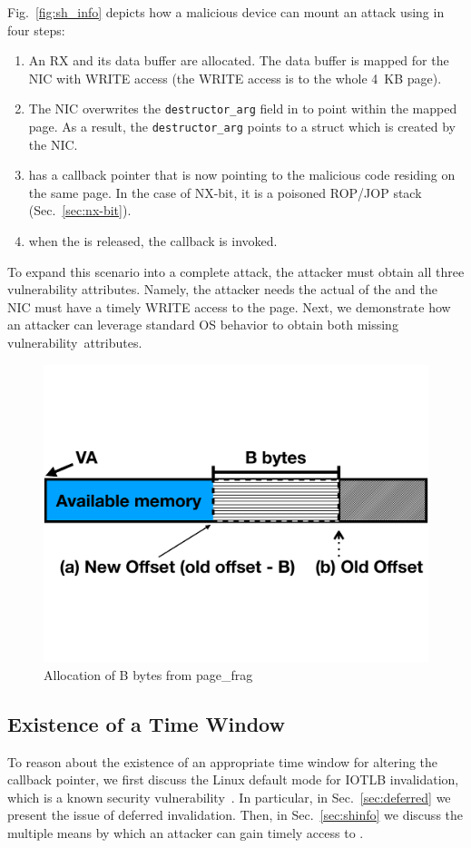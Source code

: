 Fig.~\ref{fig:sh_info} depicts how a malicious device can mount an attack using \shinfo{} in four steps:
\begin{enumerate}[label=(\alph*)]
    \item An RX \skb{} and its data buffer are allocated. The data buffer is mapped for the NIC with WRITE access (the WRITE access is to the whole 4~KB page). 
    \item The NIC overwrites the \texttt{destructor\_arg} field in \shinfo{} to point within the mapped page. As a result, the \texttt{destructor\_arg} points to a struct \uarg{} which is created by the NIC.
    \item \uarg{} has a callback pointer that is now pointing to the malicious code residing on the same page. In the case of NX-bit, it is a poisoned ROP/JOP\cite{BJFL11} stack (Sec.~\ref{sec:nx-bit}).
    \item when the \skb{} is released, the callback is invoked.
\end{enumerate}
To expand this scenario into a complete attack, the attacker must obtain all three vulnerability attributes. Namely, the attacker needs the actual \kva{} of the \mabaf{} and the NIC must have a timely WRITE access to the page. Next, we demonstrate how an attacker can leverage standard OS behavior to obtain both missing \mbox{vulnerability attributes.}

\begin{figure}[t]
    \centering
    \includegraphics[width=0.65\linewidth,trim=0 6cm 0 6cm, clip]{figs/page_frag.pdf}
    \caption{Allocation of B bytes from page\_frag}
    \label{fig:page_frags}
\end{figure}

\subsection{Existence of a Time Window}\label{sec:timely}
To reason about the existence of an appropriate time window for altering the callback pointer, we first discuss the Linux default mode for IOTLB invalidation, which is a known security vulnerability~\cite{MMT16,MSMT18}.
In particular, in Sec.~\ref{sec:deferred} we present the issue of deferred invalidation. Then, in Sec.~\ref{sec:shinfo} we discuss the multiple means by which an attacker can gain timely access to \shinfo.

